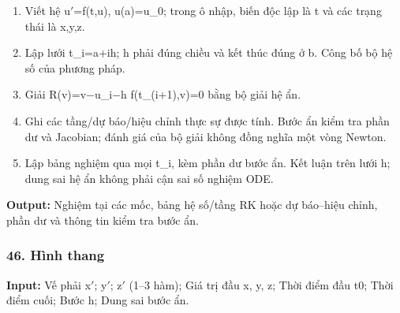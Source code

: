 \begin{enumerate}

\item Viết hệ u\ensuremath{\prime}=\allowbreak{}f(\allowbreak{}t,\allowbreak{}u),\allowbreak{} u(\allowbreak{}a)=\allowbreak{}u\_0;\allowbreak{} trong ô nhập,\allowbreak{} biến độc lập là t và các trạng thái là x,\allowbreak{}y,\allowbreak{}z.

\item Lập lưới t\_i=\allowbreak{}a+\allowbreak{}ih;\allowbreak{} h phải đúng chiều và kết thúc đúng ở b. Công bố bộ hệ số của phương pháp.

\item Giải R(\allowbreak{}v)=\allowbreak{}v\ensuremath{-}u\_i\ensuremath{-}h f(\allowbreak{}t\_(\allowbreak{}i+\allowbreak{}1),\allowbreak{}v)=\allowbreak{}0 bằng bộ giải hệ ẩn.

\item Ghi các tầng/\allowbreak{}dự báo/\allowbreak{}hiệu chỉnh thực sự được tính. Bước ẩn kiểm tra phần dư và Jacobian;\allowbreak{} đánh giá của bộ giải không đồng nghĩa một vòng Newton.

\item Lập bảng nghiệm qua mọi t\_i,\allowbreak{} kèm phần dư bước ẩn. Kết luận trên lưới h;\allowbreak{} dung sai hệ ẩn không phải cận sai số nghiệm ODE.

\end{enumerate}

\textbf{Output:} Nghiệm tại các mốc,\allowbreak{} bảng hệ số/\allowbreak{}tầng RK hoặc dự báo–hiệu chỉnh,\allowbreak{} phần dư và thông tin kiểm tra bước ẩn.

\examplebreak\subsubsection*{46. Hình thang}

\textbf{Input:} Vế phải x\ensuremath{\prime};\allowbreak{} y\ensuremath{\prime};\allowbreak{} z\ensuremath{\prime} (\allowbreak{}1–3 hàm);\allowbreak{} Giá trị đầu x,\allowbreak{} y,\allowbreak{} z;\allowbreak{} Thời điểm đầu t0;\allowbreak{} Thời điểm cuối;\allowbreak{} Bước h;\allowbreak{} Dung sai bước ẩn.

